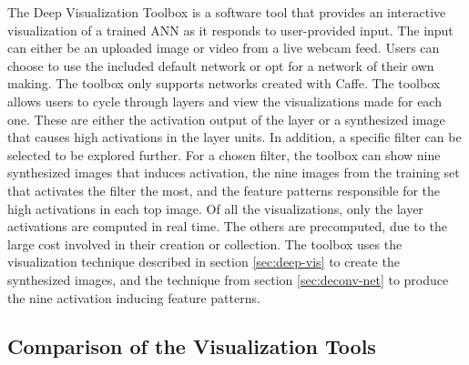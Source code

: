 The Deep Visualization Toolbox is a software tool that provides an interactive visualization of a trained ANN as it responds to user-provided input. The input can either be an uploaded image or video from a live webcam feed. Users can choose to use the included default network or opt for a network of their own making. The toolbox only supports networks created with Caffe. The toolbox allows users to cycle through layers and view the visualizations made for each one. These are either the activation output of the layer or a synthesized image that causes high activations in the layer units. In addition, a specific filter can be selected to be explored further. For a chosen filter, the toolbox can show nine synthesized images that induces activation, the nine images from the training set that activates the filter the most, and the feature patterns responsible for the high activations in each top image. Of all the visualizations, only the layer activations are computed in real time. The others are precomputed, due to the large cost involved in their creation or collection. The toolbox uses the visualization technique described in section \ref{sec:deep-vis} to create the synthesized images, and the technique from section \ref{sec:deconv-net} to produce the nine activation inducing feature patterns.


\subsection{Comparison of the Visualization Tools}

